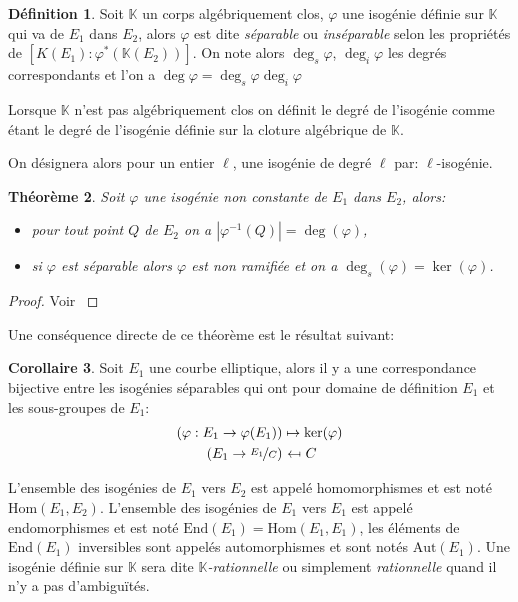 \documentclass[10pt,a4paper]{book}
\theoremstyle{plain}
\newtheorem{thm}{Théorème}
\theoremstyle{definition}
\theoremstyle{definition}
\newtheorem{cor}[thm]{Corollaire}
\theoremstyle{definition}
\theoremstyle{definition}
\newtheorem{defi}[thm]{Définition}
\theoremstyle{remark}
\theoremstyle{remark}
\begin{document}
\begin{defi}
Soit $\mathbb{K}$ un corps algébriquement clos, $\varphi$ une isogénie définie sur $\mathbb{K}$ qui va de $E_1$ dans $E_2$, alors $\varphi$ est dite \emph{séparable} ou \emph{inséparable} selon les propriétés de $[K(E_1):\varphi^*(\mathbb{K}(E_2))]$. On note alors \emph{$\deg_s{\varphi}$}, \emph{$\deg_i{\varphi}$} les degrés correspondants et l'on a $\deg{\varphi}=\deg_s{\varphi}\deg_i{\varphi}$
\end{defi}

Lorsque $\mathbb{K}$ n'est pas algébriquement clos on définit le degré de l'isogénie comme étant le degré de l'isogénie définie sur la cloture algébrique de $\mathbb{K}$.


On désignera alors pour un entier $\ell$, une isogénie de degré $\ell$ par: $\ell$-isogénie.

\begin{thm}
Soit $\varphi$ une isogénie non constante de $E_1$ dans $E_2$, alors:
\begin{itemize}
\item pour tout point $Q$ de $E_2$ on a $|\varphi^{-1}(Q)|=\deg(\varphi)$,
\item si $\varphi$ est séparable alors $\varphi$ est non ramifiée et on a $\deg_s(\varphi)=\ker(\varphi)$.
\end{itemize}
\end{thm}

\begin{proof}
Voir \cite[III.4.10]{Silv1}
\end{proof}

Une conséquence directe de ce théorème est le résultat suivant:

\begin{cor}
Soit $E_1$ une courbe elliptique, alors il y a une correspondance bijective entre les isogénies séparables qui ont pour domaine de définition $E_1$ et les sous-groupes de $E_1$:
\begin{equation*}
\begin{alignedat}{1}
(\varphi :E_1\rightarrow \varphi(E_1)) &\mapsto  \ker(\varphi)  \\
 (E_1\rightarrow\nicefrac{E_1}{C})  &\  \reflectbox{$\mapsto$} \ C 
\end{alignedat}
\end{equation*}
\end{cor}

L'ensemble des isogénies de $E_1$ vers $E_2$ est appelé homomorphismes et est noté \emph{$\mathrm{Hom}(E_1,E_2)$}. L'ensemble des isogénies de $E_1$ vers $E_1$ est appelé endomorphismes et est noté \emph{$\mathrm{End}(E_1)=\mathrm{Hom}(E_1,E_1)$}, les éléments de $\mathrm{End}(E_1)$ inversibles sont appelés automorphismes et sont notés \emph{$\mathrm{Aut}(E_1)$}. Une isogénie définie sur $\mathbb{K}$ sera dite \emph{$\mathbb{K}$-rationnelle} ou simplement \emph{rationnelle} quand il n'y a pas d'ambiguïtés.
\end{document}
